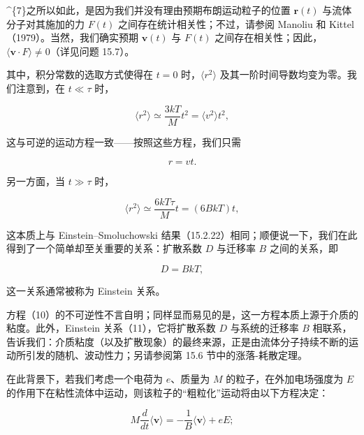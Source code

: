 \^{}\{7\}之所以如此，是因为我们并没有理由预期布朗运动粒子的位置 \(\boldsymbol{r}(t)\) 与流体分子对其施加的力 \(F(t)\) 之间存在统计相关性；不过，请参阅 Manoliu 和 Kittel（1979）。当然，我们确实预期 \(\boldsymbol{v}(t)\) 与 \(F(t)\) 之间存在相关性；因此，\(\langle \boldsymbol{v} \cdot F \rangle \neq 0\)（详见问题 15.7）。

其中，积分常数的选取方式使得在 \(t=0\) 时，\(\langle r^{2}\rangle\) 及其一阶时间导数均变为零。我们注意到，在 \(t \ll \tau\) 时，

\begin{equation}\tag{15.3.8}\label{eq:15.3.8}
\langle r ^{2} \rangle \simeq \frac { 3 k T } { M } t ^{2} = \langle v ^{2} \rangle t ^{2} ,
\end{equation}

这与可逆的运动方程一致------按照这些方程，我们只需

\begin{equation}\tag{15.3.9}\label{eq:15.3.9}
r = v t .
\end{equation}

另一方面，当 \(t \gg \tau\) 时，

\begin{equation}\tag{15.3.10}\label{eq:15.3.10}
\langle r ^{2} \rangle \simeq \frac { 6 k T \tau } { M } t = ( 6 B k T ) t ,
\end{equation}

这本质上与 Einstein--Smoluchowski 结果（15.2.22）相同；顺便说一下，我们在此得到了一个简单却至关重要的关系：扩散系数 \(D\) 与迁移率 \(B\) 之间的关系，即

\begin{equation}\tag{15.3.11}\label{eq:15.3.11}
D = B k T ,
\end{equation}

这一关系通常被称为 Einstein 关系。

方程（10）的不可逆性不言自明；同样显而易见的是，这一方程本质上源于介质的粘度。此外，Einstein 关系（11），它将扩散系数 \(D\) 与系统的迁移率 \(B\) 相联系，告诉我们：介质粘度（以及扩散现象）的最终来源，正是由流体分子持续不断的运动所引发的随机、波动性力；另请参阅第 15.6 节中的涨落-耗散定理。

在此背景下，若我们考虑一个电荷为 \(e\)、质量为 \(M\) 的粒子，在外加电场强度为 \(E\) 的作用下在粘性流体中运动，则该粒子的``粗粒化''运动将由以下方程决定：

\begin{equation}\tag{15.3.12}\label{eq:15.3.12}
M \frac { d } { d t } \langle \pmb { v } \rangle = - \frac { 1 } { B } \langle \pmb { v } \rangle + e E ;
\end{equation}

